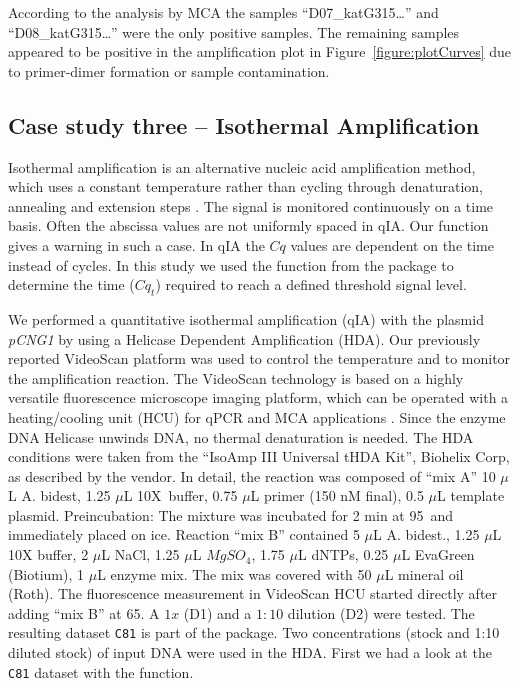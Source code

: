 According to the analysis by MCA the samples ``D07\_katG315\ldots'' and 
``D08\_katG315\ldots'' were the only positive samples. The remaining samples 
appeared to be positive in the amplification plot in 
Figure~\ref{figure:plotCurves} due to primer-dimer formation or sample 
contamination.

\subsection{Case study three -- Isothermal Amplification}

Isothermal amplification is an alternative nucleic acid amplification method, 
which uses a constant temperature rather than cycling through denaturation, 
annealing and extension steps \citep{rodiger_nucleic_2014}. The signal is 
monitored continuously on a time basis. Often the abscissa values are not 
uniformly spaced in qIA. Our  function gives a warning in such 
a case. In qIA the $Cq$ values are dependent on the time instead of cycles. In 
this study we used the  function from the  package 
to determine the time ($Cq_{t}$) required to reach a defined threshold signal 
level.

We performed a quantitative isothermal amplification (qIA) with the plasmid 
\textit{pCNG1} by using a Helicase Dependent Amplification (HDA). Our previously 
reported VideoScan platform \citep{rodiger_highly_2013} was used to control the 
temperature and to monitor the amplification reaction. The VideoScan technology 
is based on a highly versatile fluorescence microscope imaging platform, which 
can be operated with a heating/cooling unit (HCU) for qPCR and MCA applications 
\citep{roediger_RJ_2013, rodiger_highly_2013}. Since the enzyme DNA Helicase 
unwinds DNA, no thermal denaturation is needed. The HDA conditions were taken 
from the ``IsoAmp III Universal tHDA Kit'', Biohelix Corp, as described by the 
vendor. In detail, the reaction was composed of ``mix A'' 10 $\mu$L A. bidest, 
1.25 $\mu$L 10X~buffer, 0.75 $\mu$L primer (150 nM final), 0.5 $\mu$L template 
plasmid. Preincubation: The mixture was incubated for 2 min at 
95\textcelsius~and immediately placed on ice. Reaction ``mix B'' contained 5 
$\mu$L A. bidest., 1.25 $\mu$L 10X buffer, 2 $\mu$L NaCl, 1.25 $\mu$L 
$MgSO_{4}$, 1.75 $\mu$L dNTPs, 0.25 $\mu$L EvaGreen (Biotium), 1 $\mu$L enzyme 
mix. The mix was covered with 50 $\mu$L mineral oil (Roth). The fluorescence 
measurement in VideoScan HCU started directly after adding ``mix B'' at 
65\textcelsius. A $1x$ (D1) and a $1:10$ dilution (D2) were tested. The 
resulting dataset \texttt{C81} is part of the  package. Two 
concentrations (stock and 1:10 diluted stock) of input DNA were used in the HDA. 
First we had a look at the \texttt{C81} dataset with the  
function.

